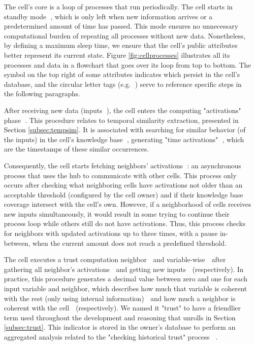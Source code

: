 The cell's core is a loop of processes that run periodically. The cell starts in standby mode \textcircled{}, which is only left when new information arrives or a predetermined amount of time has passed. This mode ensures no unnecessary computational burden of repeating all processes without new data. Nonetheless, by defining a maximum sleep time, we ensure that the cell's public attributes better represent its current state. Figure \ref{fig:cellprocesses} illustrates all its processes and data in a flowchart that goes over its loop from top to bottom. The symbol on the top right of some attributes indicates which persist in the cell's database, and the circular letter tags (e.g. \textcircled{}) serve to reference specific steps in the following paragraphs.

After receiving new data (inputs \textcircled{}), the cell enters the computing "activations" phase \textcircled{}. This procedure relates to temporal similarity extraction, presented in Section \ref{subsec:tempsim}. It is associated with searching for similar behavior (of the inputs) in the cell's knowledge base \textcircled{}, generating "time activations" \textcircled{}, which are the timestamps of these similar occurrences.

Consequently, the cell starts fetching neighbors' activations \textcircled{}: an asynchronous process that uses the hub to communicate with other cells. This process only occurs after checking what neighboring cells have activations not older than an acceptable threshold (configured by the cell owner) and if their knowledge base coverage intersect with the cell's own. However, if a neighborhood of cells receives new inputs simultaneously, it would result in some trying to continue their process loop while others still do not have activations. Thus, this process checks for neighbors with updated activations up to three times, with a pause in-between, when the current amount does not reach a predefined threshold.

The cell executes a trust computation neighbor \textcircled{} and variable-wise \textcircled{} after gathering all neighbor's activations \textcircled{} and getting new inputs \textcircled{} (respectively). In practice, this procedure generates a decimal value between zero and one for each input variable and neighbor, which describes how much that variable is coherent with the rest (only using internal information) \textcircled{} and how much a neighbor is coherent with the cell \textcircled{} (respectively). We named it "trust" to have a friendlier term used throughout the development and reasoning that unrolls in Section \ref{subsec:trust}. This indicator is stored in the owner's database to perform an aggregated analysis related to the "checking historical trust" process \textcircled{}\textcircled{}.

